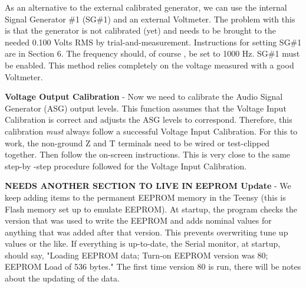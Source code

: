 As an alternative to the external calibrated generator,  we can use the internal Signal Generator \#1 (SG\#1) and an external Voltmeter.  The problem with this is that the generator is not calibrated (yet) and needs to be brought to the needed 0.100 Volts RMS by trial-and-measurement.  Instructions for setting SG\#1 are in Section 6.  The frequency should, of course , be set to 1000 Hz.  SG\#1 must be enabled.   This method relies completely on the voltage measured with a good Voltmeter.

\textbf{Voltage Output Calibration} - Now we need to calibrate the Audio Signal Generator (ASG) output levels.  This function assumes that the Voltage Input Calibration is correct and adjusts the ASG levels to correspond.  Therefore, this calibration \textit{must} always follow a successful Voltage Input Calibration.  For this to work, the non-ground Z and T terminals need to be wired  or test-clipped together.  Then follow the on-screen instructions.  This is very close to the same step-by -step procedure followed for the Voltage Input Calibration. 



\textbf{ NEEDS ANOTHER SECTION TO LIVE IN }
\textbf{EEPROM Update} - We keep adding items to the permanent EEPROM memory in the Teensy (this is Flash memory set up to emulate EEPROM).  At startup, the program checks the version that was used to write the EEPROM and adds nominal values for anything that was added after that version.  This prevents overwriting tune up values or the like.  If everything is up-to-date, the Serial monitor, at startup, should say, "Loading EEPROM data; Turn-on EEPROM version was 80; EEPROM Load of 536 bytes."  The first time version 80 is run, there will be notes about the updating of the data.
